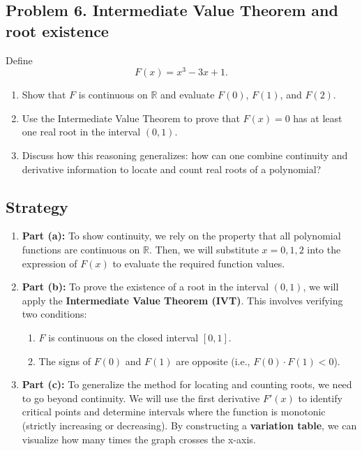 \subsection{Problem 6. Intermediate Value Theorem and root existence}
Define
\[F(x)=x^{3}-3x+1.\]
\begin{enumerate}[label=(\alph*)]
    \item Show that $F$ is continuous on $\mathbb{R}$ and evaluate $F(0)$, $F(1)$, and $F(2)$.
    \item Use the Intermediate Value Theorem to prove that $F(x)=0$ has at least one real root in the interval $(0, 1)$.
    \item Discuss how this reasoning generalizes: how can one combine continuity and derivative information to locate and count real roots of a polynomial?
\end{enumerate}

\subsection*{Strategy}
\begin{enumerate}[label=(\alph*)]
    \item \textbf{Part (a):} 
    To show continuity, we rely on the property that all polynomial functions are continuous on $\mathbb{R}$. Then, we will substitute $x=0, 1, 2$ into the expression of $F(x)$ to evaluate the required function values.
    
    \item \textbf{Part (b):} 
    To prove the existence of a root in the interval $(0, 1)$, we will apply the \textbf{Intermediate Value Theorem (IVT)}. This involves verifying two conditions:
    \begin{enumerate}
        \item $F$ is continuous on the closed interval $[0, 1]$.
        \item The signs of $F(0)$ and $F(1)$ are opposite (i.e., $F(0) \cdot F(1) < 0$).
    \end{enumerate}
    
    \item \textbf{Part (c):} 
    To generalize the method for locating and counting roots, we need to go beyond continuity. We will use the first derivative $F'(x)$ to identify critical points and determine intervals where the function is monotonic (strictly increasing or decreasing). By constructing a \textbf{variation table}, we can visualize how many times the graph crosses the x-axis.
\end{enumerate}
